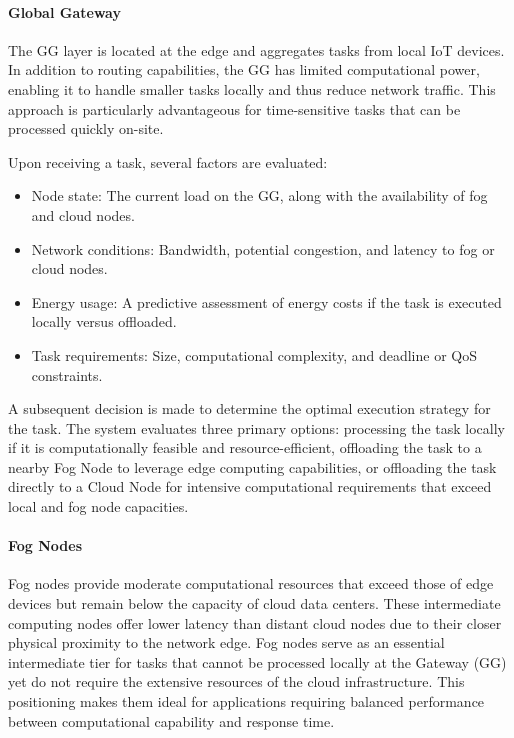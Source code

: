 \documentclass[preprint,3p,authoryear]{elsarticle}
\begin{document}
\paragraph{Global Gateway}\label{subsubsec:GG}

The GG layer is located at the edge and aggregates tasks from local IoT devices. In addition to routing capabilities, the GG has limited computational power, enabling it to handle smaller tasks locally and thus reduce network traffic. This approach is particularly advantageous for time-sensitive tasks that can be processed quickly on-site.

Upon receiving a task, several factors are evaluated:
\begin{itemize}
    \item Node state: The current load on the GG, along with the availability of fog and cloud nodes.
    \item Network conditions: Bandwidth, potential congestion, and latency to fog or cloud nodes.
    \item Energy usage: A predictive assessment of energy costs if the task is executed locally versus offloaded.
    \item Task requirements: Size, computational complexity, and deadline or QoS constraints.
\end{itemize}

A subsequent decision is made to determine the optimal execution strategy for the task. The system evaluates three primary options: processing the task locally if it is computationally feasible and resource-efficient, offloading the task to a nearby Fog Node to leverage edge computing capabilities, or offloading the task directly to a Cloud Node for intensive computational requirements that exceed local and fog node capacities.


\paragraph{Fog Nodes}\label{subsubsec:Fog}
Fog nodes provide moderate computational resources that exceed those of edge devices but remain below the capacity of cloud data centers. These intermediate computing nodes offer lower latency than distant cloud nodes due to their closer physical proximity to the network edge. Fog nodes serve as an essential intermediate tier for tasks that cannot be processed locally at the Gateway (GG) yet do not require the extensive resources of the cloud infrastructure. This positioning makes them ideal for applications requiring balanced performance between computational capability and response time.
\end{document}
